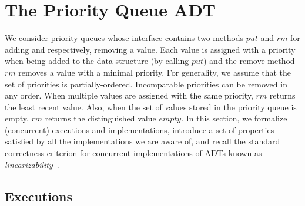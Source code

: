 \newcommand{\seqPQ}{\mathsf{SeqPQ}}

\section{The Priority Queue ADT}
\label{sec:priority queue and data-independence}

We consider priority queues whose interface contains two methods $\textit{put}$ and $\textit{rm}$ for adding and respectively, removing a value. Each value is assigned with a priority when being added to the data structure (by calling $\textit{put}$) and the remove method $\textit{rm}$ removes a value with a minimal priority. For generality, we assume that the set of priorities is partially-ordered. Incomparable priorities can be removed in any order. When multiple values are assigned with the same priority, $\textit{rm}$ returns the least recent value. Also, when the set of values stored in the priority queue is empty, $\textit{rm}$ returns the distinguished value $\textit{empty}$. In this section, we formalize (concurrent) executions and implementations, introduce a set of properties satisfied by all the implementations we are aware of, and recall the standard correctness criterion for concurrent implementations of ADTs known as \emph{linearizability}~\cite{journals/toplas/HerlihyW90}.
%
%

\subsection{Executions}\label{ssec:exec}


